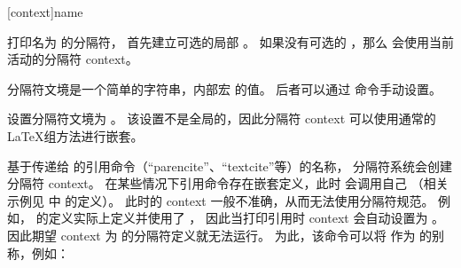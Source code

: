 \begin{ltxsyntax}
[context]{name}


打印名为  的分隔符，
首先建立可选的局部 。
如果没有可选的 ，那么  会使用当前活动的分隔符 context。


分隔符文境是一个简单的字符串，内部宏  的值。
后者可以通过  命令手动设置。



设置分隔符文境为 。
该设置不是全局的，因此分隔符 context 可以使用通常的 \LaTeX 组方法进行嵌套。



基于传递给  的引用命令（“parencite”、“textcite”等）的名称，
分隔符系统会创建分隔符 context。
在某些情况下引用命令存在嵌套定义，此时  会调用自己
（相关示例见  中  的定义）。
此时的 context 一般不准确，从而无法使用分隔符规范。
例如， 的定义实际上定义并使用了 ，
因此当打印引用时 context 会自动设置为 。
因此期望 context 为  的分隔符定义就无法运行。
为此，该命令可以将  作为  的别称，例如：


\end{ltxsyntax}
